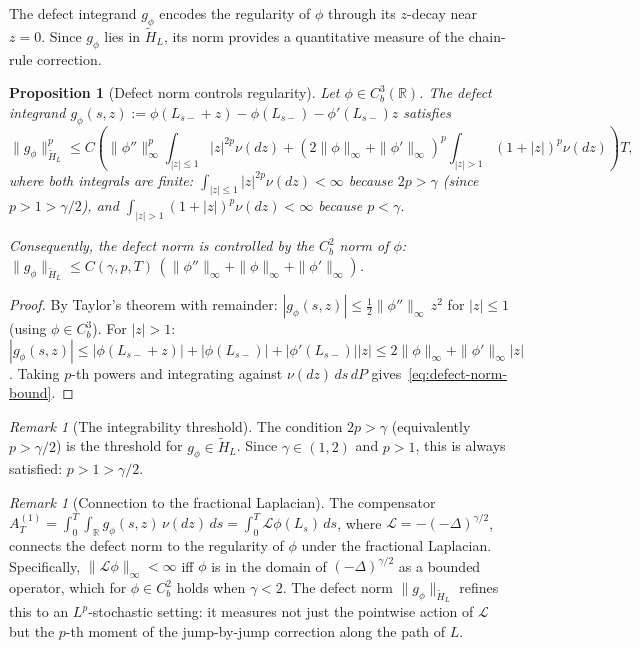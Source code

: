 \documentclass[11pt,a4paper]{article}
\theoremstyle{plain}
\newtheorem{proposition}[theorem]{Proposition}
\theoremstyle{definition}
\theoremstyle{remark}
\newtheorem{remark}[theorem]{Remark}
\newcommand{\R}{\mathbb{R}}
\begin{document}
The defect integrand $g_\phi$ encodes the regularity of
$\phi$ through its $z$-decay near $z = 0$.  Since $g_\phi$
lies in $\widetilde{H}_L$, its norm provides a quantitative
measure of the chain-rule correction.

\begin{proposition}[Defect norm controls regularity]
\label{prop:regularity}
Let $\phi \in C_b^3(\R)$.  The defect integrand
$g_\phi(s,z) := \phi(L_{s-}+z) - \phi(L_{s-})
- \phi'(L_{s-})z$ satisfies
\begin{equation}\label{eq:defect-norm-bound}
  \|g_\phi\|_{\widetilde{H}_L}^p
  \leq C\!\left(\|\phi''\|_\infty^p
  \int_{|z|\leq 1}|z|^{2p}\nu(dz)
  + (2\|\phi\|_\infty + \|\phi'\|_\infty)^p
  \int_{|z|>1}(1+|z|)^p\nu(dz)\right)\!T,
\end{equation}
where both integrals are finite:
$\int_{|z|\leq 1}|z|^{2p}\nu(dz) < \infty$ because
$2p > \gamma$ (since $p > 1 > \gamma/2$),
and $\int_{|z|>1}(1+|z|)^p\nu(dz) < \infty$ because
$p < \gamma$.

Consequently, the defect norm is controlled by the
$C_b^2$ norm of $\phi$:
$\|g_\phi\|_{\widetilde{H}_L}
\leq C(\gamma,p,T)\,
(\|\phi''\|_\infty + \|\phi\|_\infty + \|\phi'\|_\infty)$.
\end{proposition}

\begin{proof}
By Taylor's theorem with remainder:
$|g_\phi(s,z)| \leq \tfrac{1}{2}\|\phi''\|_\infty\,z^2$
for $|z| \leq 1$ (using $\phi \in C_b^3$).
For $|z| > 1$:
$|g_\phi(s,z)| \leq |\phi(L_{s-}+z)| + |\phi(L_{s-})|
+ |\phi'(L_{s-})||z|
\leq 2\|\phi\|_\infty + \|\phi'\|_\infty|z|$.
Taking $p$-th powers and integrating against
$\nu(dz)\,ds\,dP$ gives~\eqref{eq:defect-norm-bound}.
\end{proof}

\begin{remark}[The integrability threshold]
\label{rem:threshold}
The condition $2p > \gamma$ (equivalently $p > \gamma/2$)
is the threshold for $g_\phi \in \widetilde{H}_L$.
Since $\gamma \in (1,2)$ and $p > 1$, this is always
satisfied: $p > 1 > \gamma/2$.
\end{remark}

\begin{remark}[Connection to the fractional Laplacian]
\label{rem:besov}
The compensator $A_T^{(1)} = \int_0^T\!\int_\R
g_\phi(s,z)\,\nu(dz)\,ds
= \int_0^T\mathcal{L}\phi(L_s)\,ds$, where
$\mathcal{L} = -(-\Delta)^{\gamma/2}$, connects the
defect norm to the regularity of $\phi$ under the
fractional Laplacian.  Specifically,
$\|\mathcal{L}\phi\|_\infty < \infty$ iff $\phi$ is in
the domain of $(-\Delta)^{\gamma/2}$ as a bounded
operator, which for $\phi \in C_b^2$ holds when
$\gamma < 2$.  The defect norm
$\|g_\phi\|_{\widetilde{H}_L}$ refines this to an
$L^p$-stochastic setting: it measures not just the
pointwise action of $\mathcal{L}$ but the $p$-th
moment of the jump-by-jump correction along the
path of $L$.
\end{remark}
\end{document}
